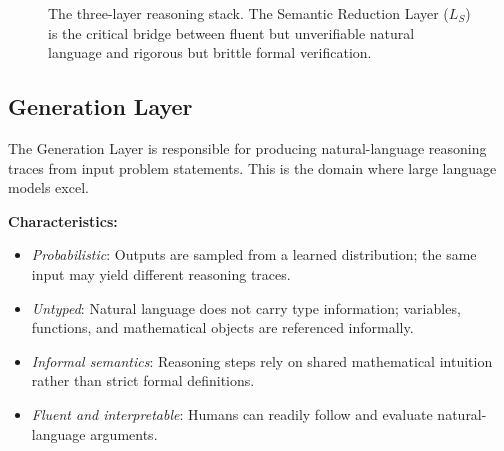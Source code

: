 \documentclass[11pt,a4paper]{article}
\begin{document}
\begin{figure}[h]
\centering
{}
\caption{The three-layer reasoning stack. The Semantic Reduction Layer ($L_S$) is the critical bridge between fluent but unverifiable natural language and rigorous but brittle formal verification.}
\label{fig:threelayer}
\end{figure}

\subsection{Generation Layer}
\label{sec:generation}

The Generation Layer is responsible for producing natural-language reasoning traces from input problem statements. This is the domain where large language models excel.

\textbf{Characteristics:}
\begin{itemize}[leftmargin=*]
    \item \textit{Probabilistic}: Outputs are sampled from a learned distribution; the same input may yield different reasoning traces.
    \item \textit{Untyped}: Natural language does not carry type information; variables, functions, and mathematical objects are referenced informally.
    \item \textit{Informal semantics}: Reasoning steps rely on shared mathematical intuition rather than strict formal definitions.
    \item \textit{Fluent and interpretable}: Humans can readily follow and evaluate natural-language arguments.
\end{itemize}
\end{document}
